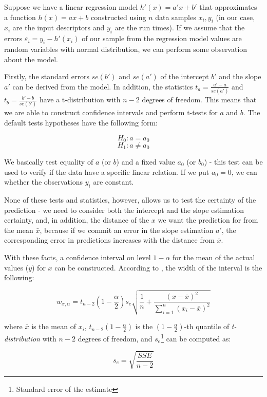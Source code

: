Suppose we have a linear regression model \(h'(x) = a' x + b'\) that approximates a function $h(x) = ax + b$ constructed using \(n\) data samples \(x_i, y_i\) (in our case, \(x_i\) are the input descriptors and \(y_i\) are the run times). If we assume that the errors $\varepsilon_i = y_i - h'(x_i)$ of our sample from the regression model values are random variables with normal distribution, we can perform some observation about the model.

Firstly, the standard errors $se(b')$ and $se(a')$ of the intercept $b'$ and the slope $a'$ can be derived from the model. In addition, the statistics $t_a = \frac{a' - a}{se(a')}$ and $t_b = \frac{b' - b}{se(b')}$ have a t-distribution with $n-2$ degrees of freedom. This means that we are able to construct confidence intervals and perform t-tests for $a$ and $b$. The default tests hypotheses have the following form:

\[H_0: a = a_0\]
\[H_1: a \neq a_0 \]

We basically test equality of $a$ (or $b$) and a fixed value $a_0$ (or $b_0$) - this test can be used to verify if the data have a specific linear relation. If we put $a_0 = 0$, we can whether the observations $y_i$ are constant. 

None of these tests and statistics, however, allows us to test the certainty of the prediction - we need to consider both the intercept and the slope estimation certainty, and, in addition, the distance of the $x$ we want the prediction for from the mean $\bar{x}$, because if we commit an error in the slope estimation $a'$, the corresponding error in predictions increases with the distance from $\bar{x}$. 

With these facts, a confidence interval on level $1 - \alpha$ for the mean of the actual values ($y$) for $x$ can be constructed. According to \cite{weiss_introductory_2010}, the width of the interval is the following:


\[
w_{x, \alpha} = t_{n - 2}(1-\frac{\alpha}{2}) s_e\sqrt{\frac{1}{n} + \frac{(x - \bar{x})^2}{ \sum_{i = 1}^{n} (x_i - \bar{x})^2 }}
\]

where \(\bar{x}\) is the mean of \(x_i\), $t_{n - 2}(1-\frac{\alpha}{2})$ is the $(1-\frac{\alpha}{2})$-th quantile of \textit{t-distribution} with $n-2$ degrees of freedom, and $s_e$\footnote{Standard error of the estimate} can be computed as:

\[s_e = \sqrt{\frac{SSE}{n-2}}\]

